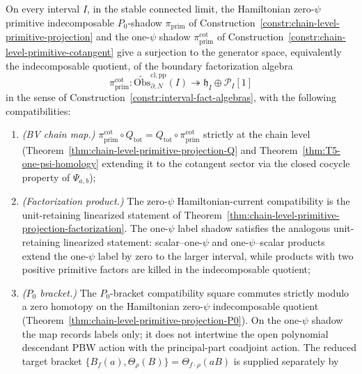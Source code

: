\begin{thm}\label{thm:chain-level-primitive-projection}
  On every interval \(I\), in the stable connected limit, the
  Hamiltonian zero-\(\psi\) primitive
  indecomposable \(P_0\)-shadow
  $\pi_{\mathrm{prim}}$ of
  Construction~\ref{constr:chain-level-primitive-projection} and the
  one-$\psi$ shadow $\pi_{\mathrm{prim}}^{\mathrm{cot}}$ of
  Construction~\ref{constr:chain-level-primitive-cotangent} give a
  surjection to the generator space, equivalently the indecomposable
  quotient, of the boundary factorization algebra
  $$\pi_{\mathrm{prim}}^{\mathrm{cot}}:
    \widetilde{\mathrm{Obs}}^{\mathrm{cl,pp}}_{\partial,N}(I)
    \twoheadrightarrow
    \mathfrak h_I\oplus\mathcal P_I[1]$$
  in the sense of Construction~\ref{constr:interval-fact-algebras},
  with the following compatibilities:
  \begin{enumerate}
    \item \emph{(BV chain map.)}
      $\pi_{\mathrm{prim}}^{\mathrm{cot}}\circ Q_{\mathrm{tot}}
      =Q_{\mathrm{tot}}\circ\pi_{\mathrm{prim}}^{\mathrm{cot}}$
      strictly at the chain level
      (Theorem~\ref{thm:chain-level-primitive-projection-Q} and
      Theorem~\ref{thm:T5-one-psi-homology} extending it to the
      cotangent sector via the closed cocycle property of $\Psi_{a,b}$);
    \item \emph{(Factorization product.)}
      The zero-\(\psi\) Hamiltonian-current compatibility is
      the unit-retaining linearized statement of
      Theorem~\ref{thm:chain-level-primitive-projection-factorization}.
      The one-\(\psi\) label shadow satisfies the analogous
      unit-retaining linearized statement: scalar--one-\(\psi\) and
      one-\(\psi\)--scalar products extend the one-\(\psi\) label by zero
      to the larger interval, while products with two positive primitive
      factors are killed in the indecomposable quotient;
		    \item \emph{($P_0$ bracket.)} The $P_0$-bracket compatibility
		      square commutes strictly modulo a zero homotopy on the
		      Hamiltonian zero-$\psi$ indecomposable quotient
		      (Theorem~\ref{thm:chain-level-primitive-projection-P0}). On the
		      one-$\psi$ shadow the map records labels only; it does
	      not intertwine the open polynomial descendant PBW action
	      with the principal-part coadjoint action. The reduced
	      target bracket
	      $\{B_f(a),\Theta_\rho(B)\}=\Theta_{f\cdot\rho}(aB)$ is supplied
	      separately by

\end{enumerate}
\end{thm}
